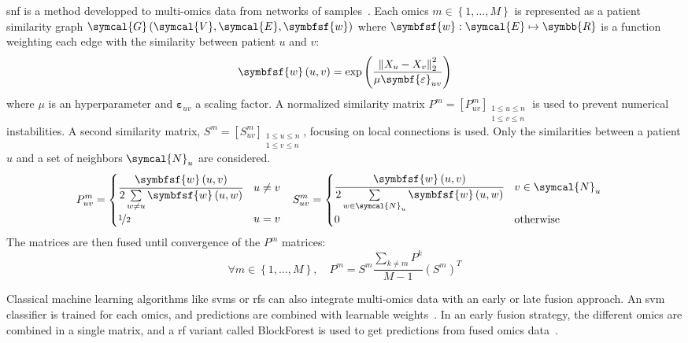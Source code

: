 \documentclass[../main.tex]{subfiles}
\begin{document}
		\begin{mybox}[label={box:snf}]{}
			\Gls{snf} is a method developped to multi-omics data from networks of samples~\cite{SNF}. 
			Each omics \(m \in \left\{1, \ldots, M\right\}\) is represented as a patient similarity graph \(\symcal{G}\left(\symcal{V}, \symcal{E}, \symbfsf{w}\right)\) where \(\symbfsf{w} : \symcal{E} \mapsto \symbb{R}\) is a function weighting each edge with the similarity between patient \(u\) and \(v\):
			\[\symbfsf{w}\left(u,v\right) = \exp\left(\frac{{\left\| X_{u} - X_{v} \right\|}^{2}_{2}}{\mu\symbf{\varepsilon}_{uv}}\right)\]
			where \(\mu\) is an hyperparameter and \(\symbf{\varepsilon}_{uv}\) a scaling factor. 
			A normalized similarity matrix \(P^{m} = {\left[P^{m}_{uv}\right]}_{\substack{1 \leq u \leq n \\ 1 \leq v \leq n}}\) is used to prevent numerical instabilities. 
			A second similarity matrix, \(S^{m} = {\left[S^{m}_{uv}\right]}_{\substack{1 \leq u \leq n \\ 1 \leq v \leq n}}\), focusing on local connections is used. 
			Only the similarities between a patient \(u\) and a set of neighbors \(\symcal{N}_{u}\) are considered. 
			\begin{align*}
				P^{m}_{uv} & = \begin{cases}
					\cfrac{\symbfsf{w}\left(u,v\right)}{2\sum\limits_{w\neq u}\symbfsf{w}\left(u,w\right)} & u \neq v\\
					\nicefrac{1}{2} & u = v
				\end{cases}	& 
				S^{m}_{uv} & = \begin{cases}
					\cfrac{\symbfsf{w}\left(u,v\right)}{2\sum\limits_{w\in \symcal{N}_{u}}\symbfsf{w}\left(u,w\right)} & v \in \symcal{N}_{u}\\
					0 & \text{otherwise}
				\end{cases}
			\end{align*}
			The matrices are then fused until convergence  of the \(P^{m}\) matrices: 
			\begin{equation*}
				\forall m \in \left\{1, \ldots, M\right\},\quad P^{m} = S^{m} \frac{\sum_{k\neq m}P^{k}}{M - 1}{\left(S^{m}\right)}^{T}
			\end{equation*}			
		\end{mybox}

		Classical machine learning algorithms like \glspl{svm} or \glspl{rf} can also integrate multi-omics data with an early or late fusion approach.
		An \gls{svm} classifier is trained for each omics, and predictions are combined with learnable weights~\cite{CarrilloPerez2022}.
		In an early fusion strategy, the different omics are combined in a single matrix, and a \gls{rf} variant called BlockForest is used to get predictions from fused omics data~\cite{Hornung2019}.
\end{document}
